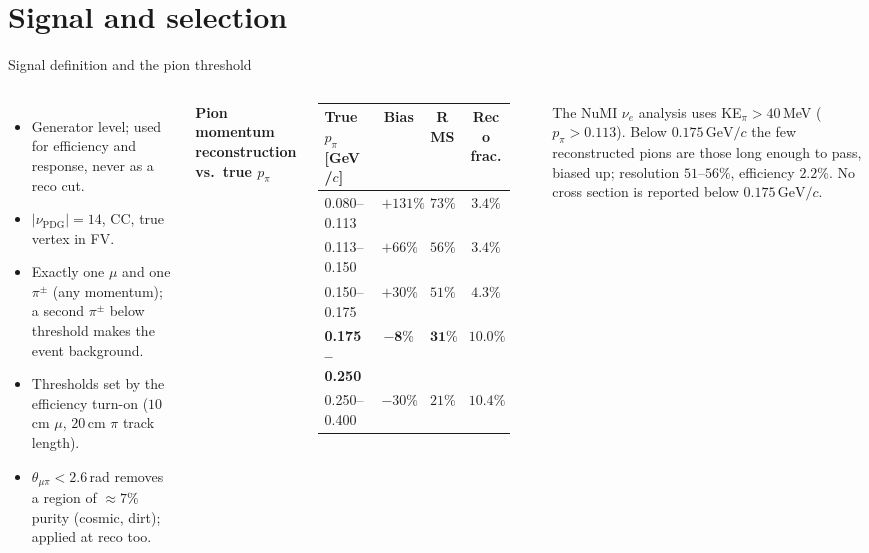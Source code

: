 \documentclass[aspectratio=169,10pt]{beamer}
\newcommand{\GeVc}{\,\text{GeV}/c}
\begin{document}
\section{Signal and selection}
\begin{frame}{Signal definition and the pion threshold}
  \begin{columns}[T]
  \begin{itemize}\small\setlength\itemsep{3pt}
    \item Generator level; used for efficiency and response, never as a reco cut.
    \item $|\nu_\mathrm{PDG}|=14$, CC, true vertex in FV.
    \item Exactly one $\mu$ and one $\pi^\pm$ (any momentum); a second $\pi^\pm$ below threshold makes the event background.
    \item Thresholds set by the efficiency turn-on ($10$\,cm $\mu$, $20$\,cm $\pi$ track length).
    \item $\theta_{\mu\pi}<2.6$\,rad removes a region of $\approx7\%$ purity (cosmic, dirt); applied at reco too.
  \end{itemize}
  \scriptsize\centering
  \textbf{Pion momentum reconstruction vs.\ true $p_\pi$}\\[1mm]
  \setlength{\tabcolsep}{3pt}
  \begin{tabular}{lccc}
    \toprule
    True $p_\pi$ [GeV/$c$] & Bias & RMS & Reco frac. \\\midrule
    0.080--0.113 & $+131\%$ & $73\%$ & $3.4\%$ \\
    0.113--0.150 & $+66\%$ & $56\%$ & $3.4\%$ \\
    0.150--0.175 & $+30\%$ & $51\%$ & $4.3\%$ \\
    \textbf{0.175--0.250} & $\mathbf{-8\%}$ & $\mathbf{31\%}$ & $\mathbf{10.0\%}$ \\
    0.250--0.400 & $-30\%$ & $21\%$ & $10.4\%$ \\
    \bottomrule
  \end{tabular}\\[2mm]
  \raggedright
  The NuMI $\nu_e$ analysis uses KE$_\pi>40$\,MeV ($p_\pi>0.113$). Below $0.175\GeVc$ the few
  reconstructed pions are those long enough to pass, biased up; resolution $51$--$56\%$,
  efficiency $2.2\%$. No cross section is reported below $0.175\GeVc$.
  \end{columns}
\end{frame}
\end{document}
